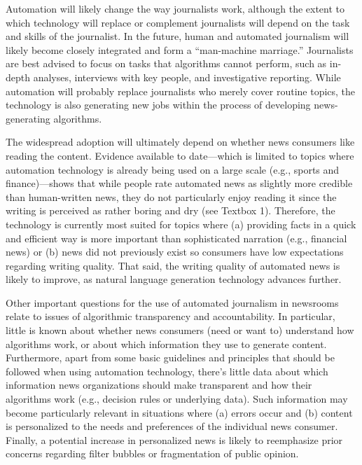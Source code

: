 \documentclass[notoc, symmetric, nobib, nols]{towcenter-guideto-book}
\begin{document}
Automation will likely change the way journalists work, although the extent to which technology will replace or complement journalists will depend on the task and skills of the journalist. In the future, human and automated journalism will likely become closely integrated and form a ``man-machine marriage.'' Journalists are best advised to focus on tasks that algorithms cannot perform, such as in-depth analyses, interviews with key people, and investigative reporting. While automation will probably replace journalists who merely cover routine topics, the technology is also generating new jobs within the process of developing news-generating algorithms. 

The widespread adoption will ultimately depend on whether news consumers like reading the content. Evidence available to date---which is limited to topics where automation technology is already being used on a large scale (e.g., sports and finance)---shows that while people rate automated news as slightly more credible than human-written news, they do not particularly enjoy reading it since the writing is perceived as rather boring and dry (see Textbox 1). Therefore, the technology is currently most suited for topics where (a) providing facts in a quick and efficient way is more important than sophisticated narration (e.g., financial news) or (b) news did not previously exist so consumers have low expectations regarding writing quality. That said, the writing quality of automated news is likely to improve, as natural language generation technology advances further.

Other important questions for the use of automated journalism in newsrooms relate to issues of algorithmic transparency and accountability. In particular, little is known about whether news consumers (need or want to) understand how algorithms work, or about which information they use to generate content. Furthermore, apart from some basic guidelines and principles that should be followed when using automation technology, there's little data about which information news organizations should make transparent and how their algorithms work (e.g., decision rules or underlying data). Such information may become particularly relevant in situations where (a) errors occur and (b) content is personalized to the needs and preferences of the individual news consumer. Finally, a potential increase in personalized news is likely to reemphasize prior concerns regarding filter bubbles or fragmentation of public opinion.
\end{document}
